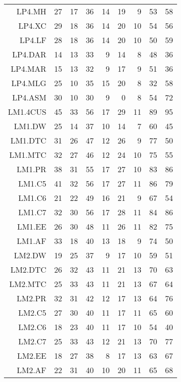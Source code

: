 \begin{longtable}{rrrrrrrrr}
  LP4.MH &  27 &  17 &  36 &  14 &  19 &   9 &  53 &  58 \\ 
  LP4.XC &  29 &  18 &  36 &  14 &  20 &  10 &  54 &  56 \\ 
  LP4.LF &  28 &  18 &  36 &  14 &  20 &  10 &  50 &  59 \\ 
  LP4.DAR &  14 &  13 &  33 &   9 &  14 &   8 &  48 &  36 \\ 
  LP4.MAR &  15 &  13 &  32 &   9 &  17 &   9 &  51 &  36 \\ 
  LP4.MLG &  25 &  10 &  35 &  15 &  20 &   8 &  32 &  58 \\ 
  LP4.ASM &  30 &  10 &  30 &   9 &   0 &   8 &  54 &  72 \\ 
  LM1.4CUS &  45 &  33 &  56 &  17 &  29 &  11 &  89 &  95 \\ 
  LM1.DW &  25 &  14 &  37 &  10 &  14 &   7 &  60 &  45 \\ 
  LM1.DTC &  31 &  26 &  47 &  12 &  26 &   9 &  77 &  50 \\ 
  LM1.MTC &  32 &  27 &  46 &  12 &  24 &  10 &  75 &  55 \\ 
  LM1.PR &  38 &  31 &  55 &  17 &  27 &  10 &  83 &  86 \\ 
  LM1.C5 &  41 &  32 &  56 &  17 &  27 &  11 &  86 &  79 \\ 
  LM1.C6 &  21 &  22 &  49 &  16 &  21 &   9 &  67 &  54 \\ 
  LM1.C7 &  32 &  30 &  56 &  17 &  28 &  11 &  84 &  86 \\ 
  LM1.EE &  26 &  30 &  48 &  11 &  26 &  11 &  82 &  75 \\ 
  LM1.AF &  33 &  18 &  40 &  13 &  18 &   9 &  74 &  50 \\ 
  LM2.DW &  19 &  25 &  37 &   9 &  17 &  10 &  59 &  51 \\ 
  LM2.DTC &  26 &  32 &  43 &  11 &  21 &  13 &  70 &  63 \\ 
  LM2.MTC &  25 &  33 &  43 &  11 &  21 &  13 &  67 &  64 \\ 
  LM2.PR &  32 &  31 &  42 &  12 &  17 &  13 &  64 &  76 \\ 
  LM2.C5 &  27 &  30 &  40 &  11 &  17 &  11 &  65 &  60 \\ 
  LM2.C6 &  18 &  23 &  40 &  11 &  17 &  10 &  54 &  40 \\ 
  LM2.C7 &  25 &  33 &  43 &  12 &  21 &  13 &  70 &  77 \\ 
  LM2.EE &  18 &  27 &  38 &   8 &  17 &  13 &  63 &  67 \\ 
  LM2.AF &  22 &  31 &  40 &  10 &  20 &  11 &  65 &  68 \\ 

\end{longtable}
